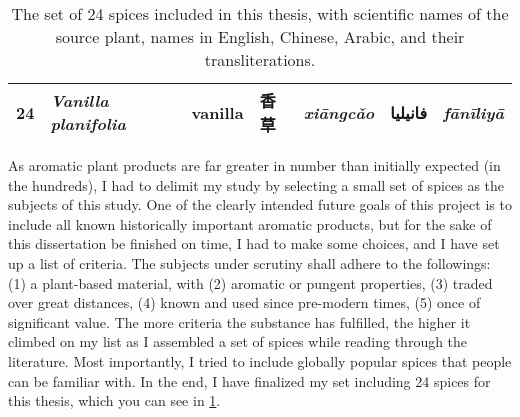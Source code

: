 \begin{table}[ht]
\begin{tabularx}{\textwidth}{@{}r>{\footnotesize}llll@{}rl@{}}
24          & \textit{Vanilla planifolia}        & vanilla          & 香草               & \textit{xiāngcǎo}        & فانيليا         & \textit{fānīliyā}\\ 
\bottomrule
\end{tabularx}
\caption[The set of 24 spices included in this thesis.]{The set of 24 spices included in this thesis, with scientific names of the source plant, names in English, Chinese, Arabic, and their transliterations.}
\label{table:set}
\end{table}

\setlength{\tabcolsep}{6pt}


As aromatic plant products are far greater in number than initially expected (in the hundreds), I had to delimit my study by selecting a small set of spices as the subjects of this study. One of the clearly intended future goals of this project is to include all known historically important aromatic products, but for the sake of this dissertation be finished on time, I had to make some choices, and I have set up a list of criteria. The subjects under scrutiny shall adhere to the followings: (1) a plant-based material, with (2) aromatic or pungent properties, (3) traded over great distances, (4) known and used since pre-modern times, (5) once of significant value. The more criteria the substance has fulfilled, the higher it climbed on my list as I assembled a set of spices while reading through the literature. Most importantly, I tried to include globally popular spices that people can be familiar with. In the end, I have finalized my set including 24 spices for this thesis, which you can see in \cref{table:set}. 

